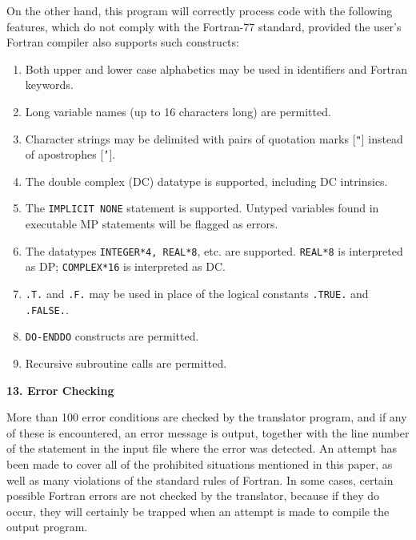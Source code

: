 On the other hand, this program will correctly process code with the
following features, which do not comply with the Fortran-77 standard,
provided the user's Fortran compiler also supports such constructs:

\begin{enumerate}

\item Both upper and lower case alphabetics may be used in identifiers
and Fortran keywords.

\item Long variable names (up to 16 characters long) are permitted.

\item Character strings may be delimited with pairs of quotation marks
[{\tt "}] instead of apostrophes [{\tt '}].

\item The double complex (DC) datatype is supported, including DC
intrinsics.

\item The {\tt IMPLICIT NONE} statement is supported.  Untyped
variables found in executable MP statements will be flagged as errors.

\item The datatypes {\tt INTEGER*4, REAL*8}, etc. are supported.
{\tt REAL*8} is interpreted as DP; {\tt COMPLEX*16} is interpreted as
DC.

\item {\tt .T.} and {\tt .F.} may be used in place of the logical
constants {\tt .TRUE.} and {\tt .FALSE.}.

\item {\tt DO-ENDDO} constructs are permitted.

\item Recursive subroutine calls are permitted.

\end{enumerate}
 
\vspace{2ex} \noindent
{\bf 13. Error Checking}

More than 100 error conditions are checked by the translator program,
and if any of these is encountered, an error message is output,
together with the line number of the statement in the input file where
the error was detected.  An attempt has been made to cover all of the
prohibited situations mentioned in this paper, as well as many
violations of the standard rules of Fortran.  In some cases, certain
possible Fortran errors are not checked by the translator, because if
they do occur, they will certainly be trapped when an attempt is made
to compile the output program.

